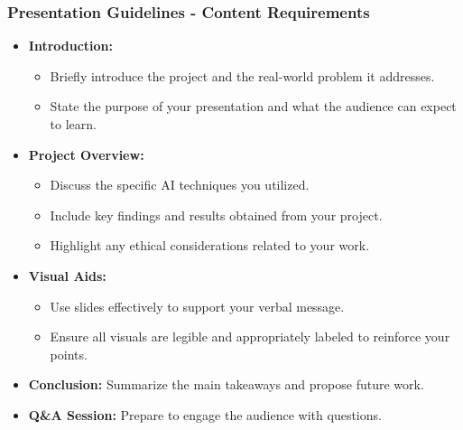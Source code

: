 \documentclass[aspectratio=169]{beamer}
\begin{document}
\begin{frame}[fragile]
    \frametitle{Presentation Guidelines - Content Requirements}
    \begin{itemize}
        \item \textbf{Introduction:}
            \begin{itemize}
                \item Briefly introduce the project and the real-world problem it addresses.
                \item State the purpose of your presentation and what the audience can expect to learn.
            \end{itemize}
        
        \item \textbf{Project Overview:}
            \begin{itemize}
                \item Discuss the specific AI techniques you utilized.
                \item Include key findings and results obtained from your project.
                \item Highlight any ethical considerations related to your work.
            \end{itemize}
        
        \item \textbf{Visual Aids:}
            \begin{itemize}
                \item Use slides effectively to support your verbal message.
                \item Ensure all visuals are legible and appropriately labeled to reinforce your points.
            \end{itemize}

        \item \textbf{Conclusion:} Summarize the main takeaways and propose future work.
        
        \item \textbf{Q\&A Session:} Prepare to engage the audience with questions.
    \end{itemize}
\end{frame}
\end{document}
